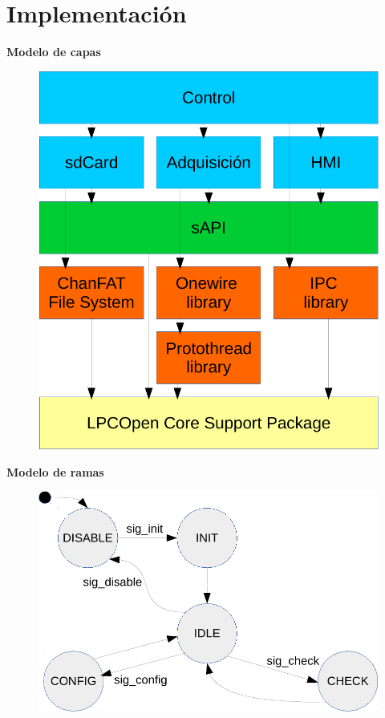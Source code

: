 \documentclass[11pt]{beamer}
\begin{document}
\section{Implementación}

\begin{frame}{\textbf{\LARGE{Modelo de capas}}}
	\vspace{-.7cm}
	\begin{figure}[H]
		\includegraphics[height=.8\textheight]{./imagenes/capas.pdf}
	\end{figure}	
\end{frame}

\begin{frame}{\textbf{\LARGE{Modelo de ramas}}}
	\vspace{-.7cm}
	\begin{figure}[H]
		\includegraphics[height=.8\textheight]{./imagenes/MEF_generica.pdf}
	\end{figure}	
\end{frame}
\end{document}
